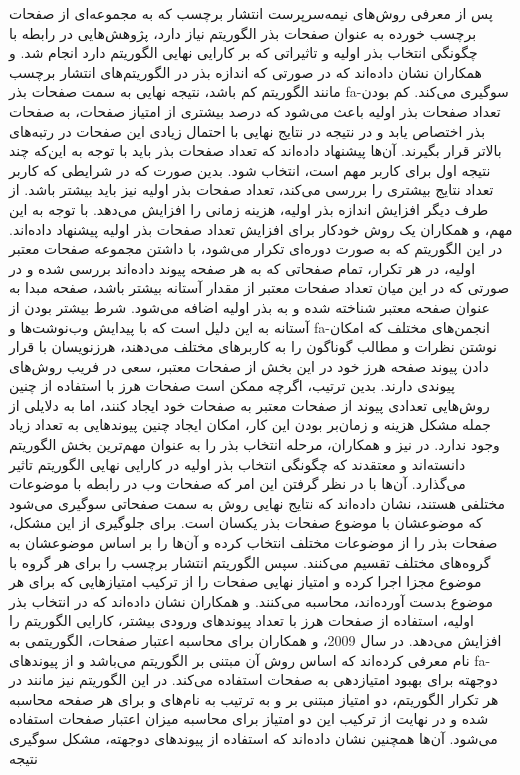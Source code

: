 \documentclass[twoside, a4paper,11pt]{book}
\numberwithin{equation}{chapter}
\numberwithin{table}{chapter}
\numberwithin{figure}{chapter}
\numberwithin{equation}{chapter}
\newcommand{\mls}[1]{\gls{fa-#1}\glsuseri{la-#1}}
\begin{document}
پس از معرفی روش‌های نیمه‌سرپرست انتشار برچسب که به مجموعه‌ای از صفحات برچسب خورده به عنوان صفحات بذر الگوریتم نیاز دارد، پژوهش‌هایی در رابطه با چگونگی انتخاب بذر اولیه و تاثیراتی که بر کارایی نهایی الگوریتم دارد انجام شد.  و همکاران \cite{jiang2008larger} نشان داده‌اند که در صورتی ‌که اندازه بذر در الگوریتم‌های انتشار برچسب مانند الگوریتم  کم باشد، نتیجه نهایی به سمت صفحات بذر \mls{سوگیری} می‌کند. کم بودن تعداد صفحات بذر اولیه باعث می‌شود که درصد بیشتری از امتیاز صفحات، به صفحات بذر اختصاص یابد و در نتیجه در نتایج نهایی با احتمال زیادی این صفحات در رتبه‌های بالاتر قرار بگیرند. آن‌ها پیشنهاد داده‌اند که تعداد صفحات بذر باید با توجه به این‌که چند نتیجه اول برای کاربر مهم است، انتخاب شود. بدین صورت که در شرایطی که کاربر تعداد نتایج بیشتری را بررسی می‌کند، تعداد صفحات بذر اولیه نیز باید بیشتر باشد. از طرف دیگر افزایش اندازه بذر اولیه، هزینه زمانی را افزایش می‌دهد. با توجه به این مهم،  و همکاران \cite{zhang2009automatic} یک روش خودکار برای افزایش تعداد صفحات بذر اولیه پیشنهاد داده‌اند. در این الگوریتم که به صورت دوره‌ای تکرار می‌شود، با داشتن مجموعه صفحات معتبر اولیه، در هر تکرار، تمام صفحاتی که به هر صفحه پیوند داده‌اند بررسی شده و در صورتی که در این میان تعداد صفحات معتبر از مقدار آستانه بیشتر باشد، صفحه مبدا به عنوان صفحه معتبر شناخته شده و به بذر اولیه اضافه می‌شود. شرط بیشتر بودن از آستانه به این دلیل است که با پیدایش وب‌نوشت‌ها و \mls{انجمن}‌های مختلف که امکان نوشتن نظرات و مطالب گوناگون را به کاربرهای مختلف می‌دهند، هرز‌نویسان با قرار دادن پیوند صفحه هرز خود در این بخش از صفحات معتبر، سعی در فریب روش‌های پیوندی دارند. بدین ترتیب، اگرچه ممکن است صفحات هرز با استفاده از چنین روش‌هایی \cite{gyongyi2006link} تعدادی پیوند از صفحات معتبر به صفحات خود ایجاد کنند، اما به دلایلی از جمله مشکل هزینه و زما‌ن‌بر بودن این کار، امکان ایجاد چنین پیوندهایی به تعداد زیاد وجود ندارد. در \cite{wu2006topical} نیز   و همکاران، مرحله انتخاب بذر را به عنوان مهم‌ترین بخش الگوریتم  دانسته‌اند و معتقدند که چگونگی انتخاب بذر اولیه در کارایی نهایی الگوریتم تاثیر می‌گذارد. آن‌ها با در نظر گرفتن این امر که صفحات وب در رابطه با موضوعات مختلفی هستند، نشان داده‌اند که نتایج نهایی روش  به سمت صفحاتی سوگیری می‌شود که موضوعشان با موضوع صفحات بذر یکسان است. برای جلوگیری از این مشکل، صفحات بذر را از موضوعات مختلف انتخاب کرده و آن‌ها را بر اساس موضوعشان به گروه‌های مختلف تقسیم می‌کنند. سپس الگوریتم انتشار برچسب را برای هر گروه با موضوع مجزا اجرا کرده و امتیاز نهایی صفحات را از ترکیب امتیازهایی که برای هر موضوع بدست آورده‌اند، محاسبه می‌کنند.  و همکاران \cite{zhao2008good} نشان داده‌اند که در انتخاب بذر اولیه، استفاده از صفحات هرز با تعداد پیوندهای ورودی بیشتر، کارایی الگوریتم‌   را افزایش می‌دهد. در سال 2009،  و همکاران \cite{zhang2009exploiting, zhang2009deeply} برای محاسبه اعتبار صفحات، الگوریتمی به نام  معرفی کرده‌اند که اساس روش آن مبتنی بر الگوریتم  \cite{kleinberg1999authoritative} می‌باشد و از پیوندهای \mls{دوجهته} برای بهبود امتیازدهی به صفحات استفاده می‌کند. در این الگوریتم نیز مانند  در هر تکرار الگوریتم، دو امتیاز مبتنی بر  و  به ترتیب به نام‌های  و  برای هر صفحه محاسبه شده و در نهایت از ترکیب این دو امتیاز برای محاسبه میزان اعتبار صفحات استفاده می‌شود. آن‌ها همچنین نشان داده‌اند که استفاده از پیوندهای دوجهته، مشکل سوگیری نتیجه 
\end{document}
